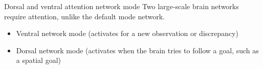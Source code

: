 \begin{frame}[allowframebreaks]{Dorsal and ventral attention network mode}
    Two large-scale brain networks require attention, unlike the default mode network.
    \begin{itemize}
        \item Ventral network mode (activates for a new observation or discrepancy) \cite{scalf-2014-trial-history-effects-in-the-ventral-attentional-network}
        \item Dorsal network mode (activates when the brain tries to follow a goal, such as a spatial goal) \cite{vossel-2014-dorsal-and-ventral-attention-systems, corbetta-2002-control-of-goal-directed-and-stimulus-driven-attention-in-the-brain}
    \end{itemize}
\end{frame}